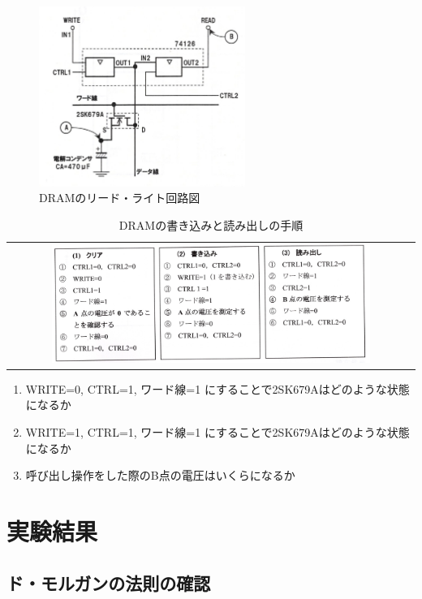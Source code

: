\documentclass{jlreq}
\numberwithin{equation}{section}
\begin{document}
\begin{figure}[H]
  \centering
  \includegraphics[width=0.6\textwidth]{assets/memorykairo.png}
  \caption{DRAMのリード・ライト回路図}
\end{figure}

\begin{table}[H]
  \centering
  \caption{DRAMの書き込みと読み出しの手順}
  \begin{tabular}{c}
    \includegraphics[width=0.8\textwidth]{assets/memoryctrl.png} \\
  \end{tabular}
\end{table}

\begin{enumerate}
  \item WRITE=0, CTRL=1, ワード線=1 にすることで2SK679Aはどのような状態になるか
  \item WRITE=1, CTRL=1, ワード線=1 にすることで2SK679Aはどのような状態になるか
  \item 呼び出し操作をした際のB点の電圧はいくらになるか
\end{enumerate}

\section{実験結果}
\subsection{ド・モルガンの法則の確認}
\end{document}
